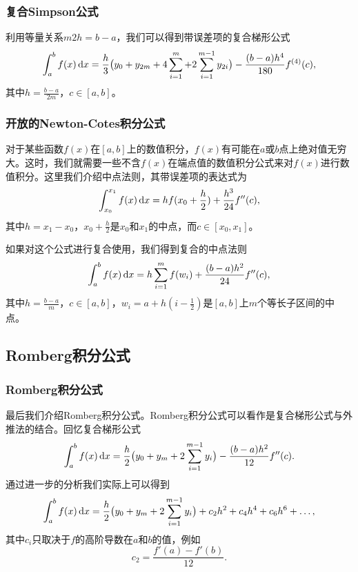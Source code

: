 \documentclass[10pt]{beamer}
\def\dx{\,{\rm d}x}
\begin{document}
\begin{frame}
\frametitle{复合Simpson公式}
利用等量关系$m2h = b-a$，我们可以得到带误差项的复合梯形公式
\begin{equation}
\int_a^bf(x) \dx = \frac{h}{3} \big( y_0 + y_{2m} + 4\sum_{i=1}^{m} + 2\sum_{i = 1}^{m-1} y_{2i} \big) - \frac{(b-a)h^4}{180}f^{(4)}(c),
\end{equation}
其中$h = \frac{b-a}{2m}$，$c \in [a,b]$。
\end{frame}


\begin{frame}
\frametitle{开放的Newton-Cotes积分公式}
对于某些函数$f(x)$在$[a,b]$上的数值积分，$f(x)$有可能在$a$或$b$点上绝对值无穷大。这时，我们就需要一些不含$f(x)$在端点值的数值积分公式来对$f(x)$进行数值积分。这里我们介绍中点法则，其带误差项的表达式为
\begin{equation}
\int_{x_0}^{x_1} f(x) \dx = hf(x_0+\frac{h}{2}) + \frac{h^3}{24} f''(c),
\end{equation}
其中$h = x_1 - x_0$，$x_0+\frac{h}{2}$是$x_0$和$x_1$的中点，而$c \in [x_0, x_1]$。

如果对这个公式进行复合使用，我们得到复合的中点法则
\begin{equation}
\int_a^b f(x) \dx = h\sum_{i = 1}^{m} f(w_i) + \frac{(b-a)h^2}{24} f''(c),
\end{equation}
其中$h = \frac{b-a}{m}$，$c \in [a,b]$，$w_i = a + h(i- \frac{1}{2})$是$[a,b]$上$m$个等长子区间的中点。
\end{frame}


\subsection{Romberg积分公式}

\begin{frame}
\frametitle{Romberg积分公式}
最后我们介绍Romberg积分公式。Romberg积分公式可以看作是复合梯形公式与外推法的结合。回忆复合梯形公式
\begin{equation}
\int_a^bf(x) \dx = \frac{h}{2} \big( y_0 + y_m + 2\sum_{i = 1}^{m-1} y_i \big) - \frac{(b-a)h^2}{12}f''(c).
\end{equation}
通过进一步的分析我们实际上可以得到
\begin{equation}
\int_a^b f(x) \dx = \frac{h}{2} \big( y_0 + y_m + 2\sum_{i = 1}^{m-1} y_i \big) + c_2 h^2 + c_4 h^4 + c_6 h^6+ \ldots,
\end{equation}
其中$c_i$只取决于$f$的高阶导数在$a$和$b$的值，例如
\begin{equation}
c_2 = \frac{f'(a) - f'(b)}{12}.
\end{equation}
\end{frame}
\end{document}

